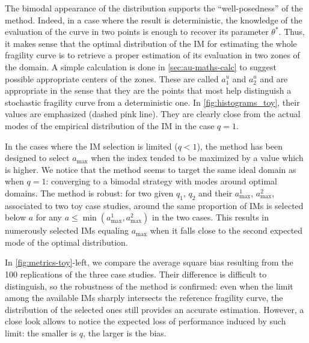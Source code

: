     The bimodal appearance of the distribution supports the ``well-posedness'' of the method. Indeed, in a case where the result is deterministic, the knowledge of the evaluation of the curve in two points is enough to recover its parameter $\theta^\ast$. Thus, it makes sense that the optimal distribution of the IM for estimating the whole fragility curve is to retrieve a proper estimation of its evaluation in two zones of the domain.
    A simple calculation is done in \cref{sec:au-maths-calc} to suggest possible appropriate centers of the zones. 
    {These are called $a^u_1$ and $a^u_2$ and are appropriate in the sense that they are the points that most help distinguish a stochastic fragility curve from a deterministic one.}
    In  \cref{fig:histograms_toy}, their values are emphasized (dashed pink line). They are clearly close from the actual modes of the empirical distribution of the IM in the case $q=1$.
    
    
    In the cases where the IM selection is limited ($q<1$), the method has been designed to select $a_{\text{max}}$ when the index tended to be maximized by a value which is higher.
    We notice that the method seems to target the same ideal domain as when $q=1$: converging to a bimodal strategy with modes around optimal domains. The method is robust: for two given $q_1$, $q_2$ and their $a_{\text{max}}^1$, $a_{\text{max}}^2$, associated to two toy case studies, around the same proportion of IMs is selected below $a$ for any $a\leq\min(a_{\text{max}}^1, a_{\text{max}}^2)$ in the two cases.
    This results in numerously selected IMs equaling $a_{\text{max}}$ when it falls close to the second expected mode of the optimal distribution.
    
    In  \cref{fig:metrics-toy}-left, we compare the average square bias
    resulting from the 100 replications of the three case studies.
    Their difference is difficult to distinguish, so the robustness of the method is confirmed: even when the limit among the available IMs sharply intersects  the reference fragility curve, the distribution of the selected ones still provides an accurate estimation.
    However, a close look allows to notice the expected loss of performance induced by such limit: the smaller is $q$, the larger is the bias.
    
